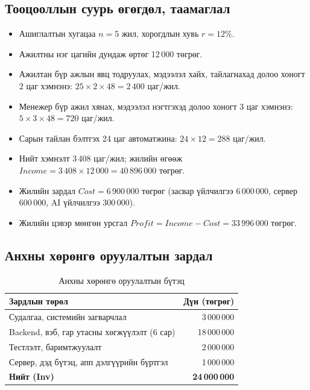 \subsection{Тооцооллын суурь өгөгдөл, таамаглал}
\begin{itemize}
    \item Ашиглалтын хугацаа $n = 5$ жил, хорогдлын хувь $r = 12\%$.
    \item Ажилтны нэг цагийн дундаж өртөг 12\,000 төгрөг.
    \item Ажилтан бүр ажлын явц тодруулах, мэдээлэл хайх, тайлагнахад долоо хоногт 2 цаг хэмнэнэ: $25 \times 2 \times 48 = 2\,400$ цаг/жил.
    \item Менежер бүр ажил хянах, мэдээлэл нэгтгэхэд долоо хоногт 3 цаг хэмнэнэ: $5 \times 3 \times 48 = 720$ цаг/жил.
    \item Сарын тайлан бэлтгэх 24 цаг автоматжина: $24 \times 12 = 288$ цаг/жил.
    \item Нийт хэмнэлт 3\,408 цаг/жил; жилийн өгөөж $Income = 3\,408 \times 12\,000 = 40\,896\,000$ төгрөг.
    \item Жилийн зардал $Cost = 6\,900\,000$ төгрөг (засвар үйлчилгээ 6\,000\,000, сервер 600\,000, AI үйлчилгээ 300\,000).
    \item Жилийн цэвэр мөнгөн урсгал $Profit = Income - Cost = 33\,996\,000$ төгрөг.
\end{itemize}

\subsection{Анхны хөрөнгө оруулалтын зардал}
\begin{table}[H]
\centering
\caption{Анхны хөрөнгө оруулалтын бүтэц}
\label{table:inv}
\begin{tabular}{|p{8cm}|r|}
\hline
\textbf{Зардлын төрөл} & \textbf{Дүн (төгрөг)} \\ \hline
Судалгаа, системийн загварчлал & 3\,000\,000 \\ \hline
Backend, вэб, гар утасны хөгжүүлэлт (6 сар) & 18\,000\,000 \\ \hline
Тестлэлт, баримтжуулалт & 2\,000\,000 \\ \hline
Сервер, дэд бүтэц, апп дэлгүүрийн бүртгэл & 1\,000\,000 \\ \hline
\textbf{Нийт (Inv)} & \textbf{24\,000\,000} \\ \hline
\end{tabular}
\end{table}

